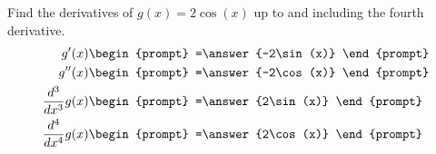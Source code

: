 \documentclass{ximera}
\author{Gregory Hartman \and Matthew Carr}
\begin{document}
\begin{exercise}




Find the derivatives of $g(x)=2\cos(x)$ up to and including the fourth derivative.
\begin{align*} 
g'(x)&
\begin{prompt}
=\answer{-2\sin(x)}
\end{prompt}\\
g''(x)&
\begin{prompt}
=\answer{-2\cos(x)}
\end{prompt}\\
\frac{d^3}{dx^3}g(x)&
\begin{prompt}
=\answer{2\sin(x)}
\end{prompt}\\
\frac{d^4}{dx^4}g(x)&
\begin{prompt}
=\answer{2\cos(x)}
\end{prompt}
\end{align*}

\end{exercise}
\end{document}
